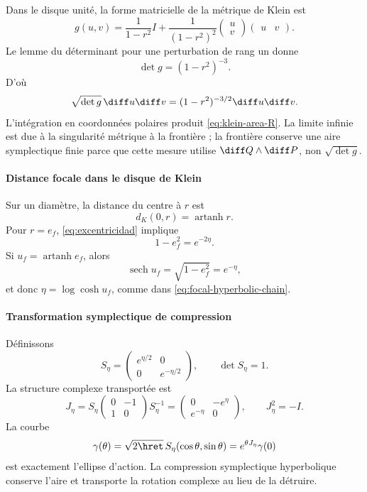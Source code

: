 Dans le disque unité, la forme matricielle de la métrique de Klein est
\[
g(u,v)=\frac1{1-r^2}I
+\frac1{(1-r^2)^2}
\begin{pmatrix}u\\v\end{pmatrix}
\begin{pmatrix}u&v\end{pmatrix}.
\]
Le lemme du déterminant pour une perturbation de rang un donne
\[
\det g=(1-r^2)^{-3}.
\]
D'où
\[
\sqrt{\det g}\,\diff u\diff v
=(1-r^2)^{-3/2}\diff u\diff v.
\]
L'intégration en coordonnées polaires produit \eqref{eq:klein-area-R}. La limite infinie est
due à la singularité métrique à la frontière ; la frontière conserve une
aire symplectique finie parce que cette mesure utilise \(\diff Q\wedge\diff P\),
non \(\sqrt{\det g}\).

\paragraph{Distance focale dans le disque de Klein}

Sur un diamètre, la distance du centre à \(r\) est
\[
d_K(0,r)=\operatorname{artanh}r.
\]
Pour \(r=e_f\), \eqref{eq:excentricidad} implique
\[
1-e_f^2=e^{-2\eta}.
\]
Si \(u_f=\operatorname{artanh}e_f\), alors
\[
\operatorname{sech}u_f=\sqrt{1-e_f^2}=e^{-\eta},
\]
et donc \(\eta=\log\cosh u_f\), comme dans
\eqref{eq:focal-hyperbolic-chain}.

\paragraph{Transformation symplectique de compression}

Définissons
\begin{equation}
S_\eta=
\begin{pmatrix}e^{\eta/2}&0\\0&e^{-\eta/2}\end{pmatrix},
\qquad \det S_\eta=1.
\label{eq:compresión simpléctica}
\end{equation}
La structure complexe transportée est
\begin{equation}
J_\eta=S_\eta
\begin{pmatrix}0&-1\\1&0\end{pmatrix}
S_\eta^{-1}
=\begin{pmatrix}0&-e^\eta\\e^{-\eta}&0\end{pmatrix},
\qquad J_\eta^2=-I.
\label{eq:Jeta}
\end{equation}
La courbe
\[
\gamma(\theta)=\sqrt{2\hret}\,
S_\eta(\cos\theta,\sin\theta)
=e^{\theta J_\eta}\gamma(0)
\]
est exactement l'ellipse d'action. La compression symplectique hyperbolique conserve l'aire et
transporte la rotation complexe au lieu de la détruire.

